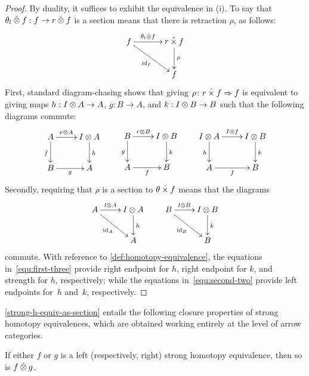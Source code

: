 \documentclass[reqno,10pt,a4paper,oneside]{amsart}
\begin{document}
\begin{proof}
By duality, it suffices to exhibit the equivalence in (i). To say that $\theta_{l} \mathbin{\hat{\otimes}} f : f \to r \mathbin{\hat{\otimes}} f$ is a section means that
there is retraction $\rho$, as follows:
\[
\xymatrix@C+1em{
  f
  \ar[r]^-{\thetal \hatotimes f}
  \ar[dr]_{\id_f} &   \intervalr \hattimes f \ar[d]^{\rho} \\
&   f
}
\]
First, standard diagram-chasing shows that giving $\rho \colon r \mathbin{\hat{\times}} f \Rightarrow f$ is equivalent  to giving maps $h : I \otimes A \to A$, $g : B \to A$, and $k : I \otimes B \to B$ such that the following diagrams commute:
\begin{equation}
\label{equ:first-three}
\xycenter{
A \ar[r]^-{\intervalr \otimes A}  \ar[d]_f & \interval \otimes A \ar[d]^{h} \\
B \ar[r]_{g} & A}  \qquad
\xycenter{
B \ar[r]^-{\intervalr \otimes B} \ar[d]_g & \interval \otimes B \ar[d]^{k} \\
A \ar[r]_f & B} \qquad
\xycenter{ 
\interval \otimes A \ar[d]_h \ar[r]^{I \otimes f} & \interval \otimes B \ar[d]^k \\
A \ar[r]_{f} & B }
\end{equation}
Secondly, requiring that $\rho$ is a section to $\theta \mathbin{\hat{\times}} f$ means that the diagrams
\begin{equation}
\label{equ:second-two}
\xycenter{
A \ar[r]^-{\intervall \otimes A} \ar[dr]_{\id_A} & \interval \otimes A \ar[d]^h \\ 
 & A } \qquad
 \xycenter{
 B \ar[r]^-{\intervall \otimes B}  \ar[dr]_{\id_B} & \interval \otimes B \ar[d]^{k} \\
  & B} 
\end{equation}
commute. With reference to \cref{def:homotopy-equivalence}, the equations in~\eqref{equ:first-three} provide right endpoint for $h$, 
right endpoint for $k$, and strength for $h$, respectively; while the equations in~\eqref{equ:second-two} provide left endpoints for~$h$ and~$k$, respectively.
\end{proof}

\cref{strong-h-equiv-as-section} entails the following closure properties of strong homotopy equivalences, which are obtained working entirely at the level of arrow categories.

\begin{proposition}
\label{strong-h-equiv-closed-under-monoidal-prod}
If either $f$ or $g$ is a left (respectively, right) strong homotopy equivalence, then so is $f \mathbin{\hat{\otimes}} g$.
\end{proposition}
\end{document}
